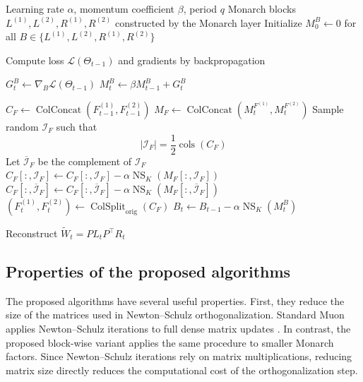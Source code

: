 \documentclass{article}
\begin{document}
\begin{algorithm}[H]
\caption{Random column-partitioned Muon update for Monarch layers}
\label{alg:compact_random_column_muon}
\small
\begin{algorithmic}[1]
\Require Learning rate \(\alpha\), momentum coefficient \(\beta\), period \(q\)
\Require Monarch blocks \(L^{(1)}, L^{(2)}, R^{(1)}, R^{(2)}\) constructed by the Monarch layer
\State Initialize \(M_0^B \gets 0\) for all \(B \in \{L^{(1)},L^{(2)},R^{(1)},R^{(2)}\}\)

    \State Compute loss \(\mathcal{L}(\Theta_{t-1})\) and gradients by backpropagation

        \State \(G_t^B \gets \nabla_B \mathcal{L}(\Theta_{t-1})\)
        \State \(M_t^B \gets \beta M_{t-1}^B + G_t^B\)
    \EndFor

            \State \(C_F \gets \operatorname{ColConcat}(F^{(1)}_{t-1},F^{(2)}_{t-1})\)
            \State \(M_F \gets \operatorname{ColConcat}(M_t^{F^{(1)}},M_t^{F^{(2)}})\)
            \State Sample random \(\mathcal{I}_F\) such that
            \[
            |\mathcal{I}_F|=\frac{1}{2}\operatorname{cols}(C_F)
            \]
            \State Let \(\overline{\mathcal{I}}_F\) be the complement of \(\mathcal{I}_F\)
            \State \(C_F[:,\mathcal{I}_F] \gets C_F[:,\mathcal{I}_F]
            - \alpha \operatorname{NS}_K(M_F[:,\mathcal{I}_F])\)
            \State \(C_F[:,\overline{\mathcal{I}}_F] \gets C_F[:,\overline{\mathcal{I}}_F]
            - \alpha \operatorname{NS}_K(M_F[:,\overline{\mathcal{I}}_F])\)
            \State \((F^{(1)}_t,F^{(2)}_t) \gets \operatorname{ColSplit}_{\mathrm{orig}}(C_F)\)
        \EndFor
    \Else
            \State \(B_t \gets B_{t-1} - \alpha \operatorname{NS}_K(M_t^B)\)
        \EndFor
    \EndIf

    \State Reconstruct \(\widetilde{W}_t = P L_t P^\top R_t\)
\EndFor
\end{algorithmic}
\end{algorithm}

\subsection{Properties of the proposed algorithms}

The proposed algorithms have several useful properties. First, they reduce the size of the matrices used in Newton--Schulz orthogonalization. Standard Muon applies Newton--Schulz iterations to full dense matrix updates \cite{jordan2024muon,liu2025muonscalablellmtraining}. In contrast, the proposed block-wise variant applies the same procedure to smaller Monarch factors. Since Newton--Schulz iterations rely on matrix multiplications, reducing matrix size directly reduces the computational cost of the orthogonalization step.
\end{document}
